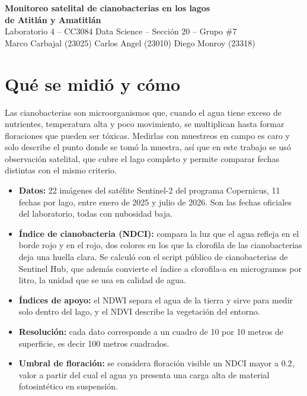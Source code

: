 \documentclass[10pt,a4paper]{article}
\begin{document}
\begin{center}
{\LARGE\bfseries Monitoreo satelital de cianobacterias en los lagos\\[2pt]
de Atitlán y Amatitlán}\\[6pt]
{\normalsize Laboratorio 4 -- CC3084 Data Science -- Sección 20 -- Grupo \#7}\\[4pt]
{\small Marco Carbajal (23025) \quad Carlos Angel (23010) \quad Diego Monroy (23318)}
\end{center}

\vspace{2pt}

\section{Qué se midió y cómo}

Las cianobacterias son microorganismos que, cuando el agua tiene exceso de nutrientes, temperatura alta y poco
movimiento, se multiplican hasta formar floraciones que pueden ser tóxicas. Medirlas con muestreos en campo es caro
y solo describe el punto donde se tomó la muestra, así que en este trabajo se usó observación satelital, que cubre
el lago completo y permite comparar fechas distintas con el mismo criterio.

\begin{itemize}
  \item \textbf{Datos:} 22 imágenes del satélite Sentinel-2 del programa Copernicus, 11 fechas por lago, entre enero
  de 2025 y julio de 2026. Son las fechas oficiales del laboratorio, todas con nubosidad baja.
  \item \textbf{Índice de cianobacteria (NDCI):} compara la luz que el agua refleja en el borde rojo y en el rojo,
  dos colores en los que la clorofila de las cianobacterias deja una huella clara. Se calculó con el script público
  de cianobacterias de Sentinel Hub, que además convierte el índice a clorofila-a en microgramos por litro, la
  unidad que se usa en calidad de agua.
  \item \textbf{Índices de apoyo:} el NDWI separa el agua de la tierra y sirve para medir solo dentro del lago, y el
  NDVI describe la vegetación del entorno.
  \item \textbf{Resolución:} cada dato corresponde a un cuadro de 10 por 10 metros de superficie, es decir 100
  metros cuadrados.
  \item \textbf{Umbral de floración:} se considera floración visible un NDCI mayor a 0.2, valor a partir del cual el
  agua ya presenta una carga alta de material fotosintético en suspensión.
\end{itemize}
\end{document}
